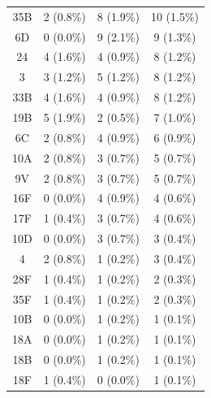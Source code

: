 \documentclass{article}
\begin{document}
\begin{table}[hbt!]
{\begin{tabular}{cccc}
35B                                       & 2 (0.8\%)       & 8 (1.9\%)          & 10 (1.5\%)      \\
6D                                        & 0 (0.0\%)       & 9 (2.1\%)          & 9 (1.3\%)       \\
24                                        & 4 (1.6\%)       & 4 (0.9\%)          & 8 (1.2\%)       \\
3                                         & 3 (1.2\%)       & 5 (1.2\%)          & 8 (1.2\%)       \\
33B                                       & 4 (1.6\%)       & 4 (0.9\%)          & 8 (1.2\%)       \\
19B                                       & 5 (1.9\%)       & 2 (0.5\%)          & 7 (1.0\%)       \\
6C                                        & 2 (0.8\%)       & 4 (0.9\%)          & 6 (0.9\%)       \\
10A                                       & 2 (0.8\%)       & 3 (0.7\%)          & 5 (0.7\%)       \\
9V                                        & 2 (0.8\%)       & 3 (0.7\%)          & 5 (0.7\%)       \\
16F                                       & 0 (0.0\%)       & 4 (0.9\%)          & 4 (0.6\%)       \\
17F                                       & 1 (0.4\%)       & 3 (0.7\%)          & 4 (0.6\%)       \\
10D                                       & 0 (0.0\%)       & 3 (0.7\%)          & 3 (0.4\%)       \\
4                                         & 2 (0.8\%)       & 1 (0.2\%)          & 3 (0.4\%)       \\
28F                                       & 1 (0.4\%)       & 1 (0.2\%)          & 2 (0.3\%)       \\
35F                                       & 1 (0.4\%)       & 1 (0.2\%)          & 2 (0.3\%)       \\
10B                                       & 0 (0.0\%)       & 1 (0.2\%)          & 1 (0.1\%)       \\
18A                                       & 0 (0.0\%)       & 1 (0.2\%)          & 1 (0.1\%)       \\
18B                                       & 0 (0.0\%)       & 1 (0.2\%)          & 1 (0.1\%)       \\
18F                                       & 1 (0.4\%)       & 0 (0.0\%)          & 1 (0.1\%)       \\

\end{tabular}}
\end{table}
\end{document}
